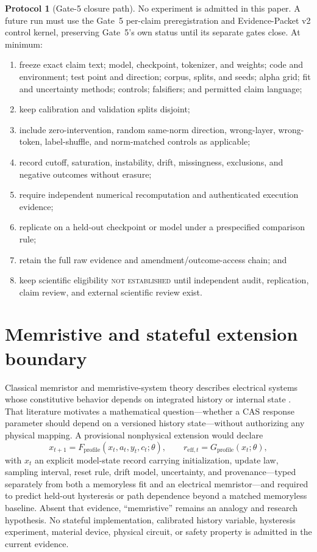 \documentclass[11pt]{amsart}
\theoremstyle{definition}
\newtheorem{protocol}[theorem]{Protocol}
\theoremstyle{remark}
\begin{document}
\begin{protocol}[Gate-5 closure path]\label{prot:gate5}
No experiment is admitted in this paper. A future run must use the Gate~5 per-claim preregistration and Evidence-Packet v2 control kernel, preserving Gate~5's own status until its separate gates close. At minimum:
\begin{enumerate}
\item freeze exact claim text; model, checkpoint, tokenizer, and weights; code and environment; test point and direction; corpus, splits, and seeds; alpha grid; fit and uncertainty methods; controls; falsifiers; and permitted claim language;
\item keep calibration and validation splits disjoint;
\item include zero-intervention, random same-norm direction, wrong-layer, wrong-token, label-shuffle, and norm-matched controls as applicable;
\item record cutoff, saturation, instability, drift, missingness, exclusions, and negative outcomes without erasure;
\item require independent numerical recomputation and authenticated execution evidence;
\item replicate on a held-out checkpoint or model under a prespecified comparison rule;
\item retain the full raw evidence and amendment/outcome-access chain; and
\item keep scientific eligibility \textsc{not established} until independent audit, replication, claim review, and external scientific review exist.
\end{enumerate}
\end{protocol}

\section{Memristive and stateful extension boundary}\label{sec:memristive}

Classical memristor and memristive-system theory describes electrical systems whose constitutive behavior depends on integrated history or internal state \cite{chua71,chuakang76}. That literature motivates a mathematical question---whether a CAS response parameter should depend on a versioned history state---without authorizing any physical mapping. A provisional nonphysical extension would declare
\[
x_{t+1}=F_{\mathrm{profile}}(x_t,a_t,y_t,c_t;\theta),\qquad
r_{\mathrm{eff},t}=G_{\mathrm{profile}}(x_t;\theta),
\]
with $x_t$ an explicit model-state record carrying initialization, update law, sampling interval, reset rule, drift model, uncertainty, and provenance---typed separately from both a memoryless fit and an electrical memristor---and required to predict held-out hysteresis or path dependence beyond a matched memoryless baseline. Absent that evidence, ``memristive'' remains an analogy and research hypothesis. No stateful implementation, calibrated history variable, hysteresis experiment, material device, physical circuit, or safety property is admitted in the current evidence.
\end{document}
